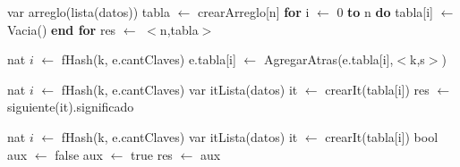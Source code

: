 \disFuncionDeAbsFuncionesAux


\newpage
\disAlgoritmos
\begin{algorithm}[H]
\begin{algorithmic}[1]
 
	\State var arreglo(lista(datos)) tabla $\gets$ crearArreglo[n] 
	\State \textbf{for} i $\gets$ 0 \textbf{to} n \textbf{do} 
  	\State tabla[i] $\gets$ Vacia() 
  	\State \textbf{end for}
  	\State res $\gets$ $<$n,tabla$>$ 
\EndFunction
\end{algorithmic}
\end{algorithm}

\begin{algorithm}[H]
\begin{algorithmic}[1]
 
    \State nat $i$ $\gets$ fHash(k, e.cantClaves) 
    \State e.tabla[i] $\gets$ AgregarAtras(e.tabla[i],$<$k,s$>$) 
\EndFunction
\end{algorithmic}
\end{algorithm}

\begin{algorithm}[H]
\begin{algorithmic}[1]
 
  \State nat $i$ $\gets$ fHash(k, e.cantClaves) 
  \State var itLista(datos) it $\gets$ crearIt(tabla[i])
    \State res $\gets$ siguiente(it).significado
  \EndIf
  \EndWhile
\EndFunction
\end{algorithmic}
\end{algorithm}



\begin{algorithm}[H]
\begin{algorithmic}[1]
 
  \State nat $i$ $\gets$ fHash(k, e.cantClaves) 
  \State var itLista(datos) it $\gets$ crearIt(tabla[i])
  \State bool aux $\gets$ false
    \State aux $\gets$ true
  \EndIf
  \EndWhile
  \State res $\gets$ aux
\EndFunction
\end{algorithmic}
\end{algorithm}

